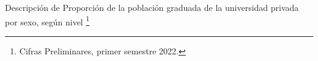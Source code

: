 Descripción de Proporción de la población graduada de la universidad privada por sexo, según nivel \footnote{Cifras Preliminares, primer semestre 2022.}